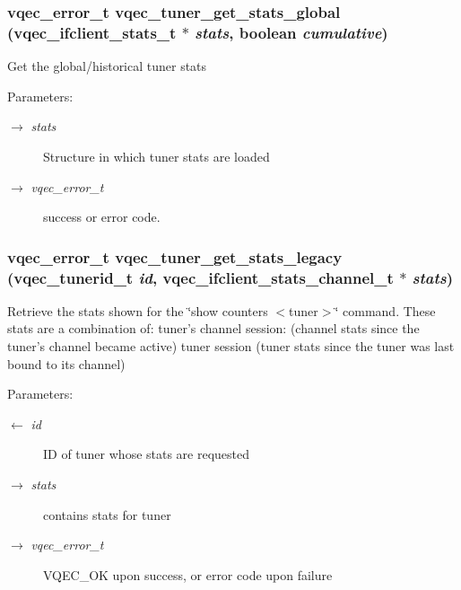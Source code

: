 \subsubsection{\setlength{\rightskip}{0pt plus 5cm}vqec\_\-error\_\-t vqec\_\-tuner\_\-get\_\-stats\_\-global (\bf{vqec\_\-ifclient\_\-stats\_\-t} $\ast$ {\em stats}, boolean {\em cumulative})}\label{vqec__tuner_8h_8c7bede0f83da6759d2cf511c4d389fd}


Get the global/historical tuner stats

\begin{Desc}
\item[Parameters:]
\begin{description}
\item[\mbox{$\rightarrow$} {\em stats}]Structure in which tuner stats are loaded \item[\mbox{$\rightarrow$} {\em vqec\_\-error\_\-t}]success or error code. \end{description}
\end{Desc}
\subsubsection{\setlength{\rightskip}{0pt plus 5cm}vqec\_\-error\_\-t vqec\_\-tuner\_\-get\_\-stats\_\-legacy (vqec\_\-tunerid\_\-t {\em id}, \bf{vqec\_\-ifclient\_\-stats\_\-channel\_\-t} $\ast$ {\em stats})}\label{vqec__tuner_8h_8fe484fd125c9568d295a962356e6d08}


Retrieve the stats shown for the \char`\"{}show counters $<$tuner$>$\char`\"{} command. These stats are a combination of: tuner's channel session: (channel stats since the tuner's channel became active) tuner session (tuner stats since the tuner was last bound to its channel)

\begin{Desc}
\item[Parameters:]
\begin{description}
\item[\mbox{$\leftarrow$} {\em id}]ID of tuner whose stats are requested \item[\mbox{$\rightarrow$} {\em stats}]contains stats for tuner \item[\mbox{$\rightarrow$} {\em vqec\_\-error\_\-t}]VQEC\_\-OK upon success, or error code upon failure \end{description}
\end{Desc}

